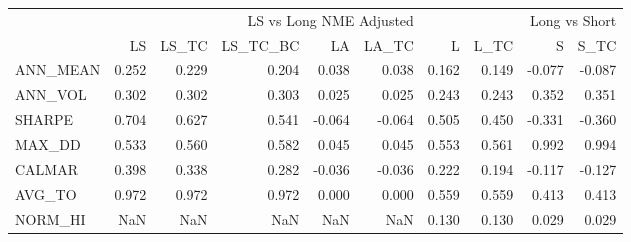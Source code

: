 \begin{tabular}{lrrrrrrrrr}
\toprule
 & \multicolumn{5}{r}{LS vs Long NME Adjusted} & \multicolumn{4}{r}{Long vs Short} \\
 & LS & LS\_TC & LS\_TC\_BC & LA & LA\_TC & L & L\_TC & S & S\_TC \\
\midrule
ANN\_MEAN & 0.252 & 0.229 & 0.204 & 0.038 & 0.038 & 0.162 & 0.149 & -0.077 & -0.087 \\
ANN\_VOL & 0.302 & 0.302 & 0.303 & 0.025 & 0.025 & 0.243 & 0.243 & 0.352 & 0.351 \\
SHARPE & 0.704 & 0.627 & 0.541 & -0.064 & -0.064 & 0.505 & 0.450 & -0.331 & -0.360 \\
MAX\_DD & 0.533 & 0.560 & 0.582 & 0.045 & 0.045 & 0.553 & 0.561 & 0.992 & 0.994 \\
CALMAR & 0.398 & 0.338 & 0.282 & -0.036 & -0.036 & 0.222 & 0.194 & -0.117 & -0.127 \\
AVG\_TO & 0.972 & 0.972 & 0.972 & 0.000 & 0.000 & 0.559 & 0.559 & 0.413 & 0.413 \\
NORM\_HI & NaN & NaN & NaN & NaN & NaN & 0.130 & 0.130 & 0.029 & 0.029 \\
\bottomrule
\end{tabular}
